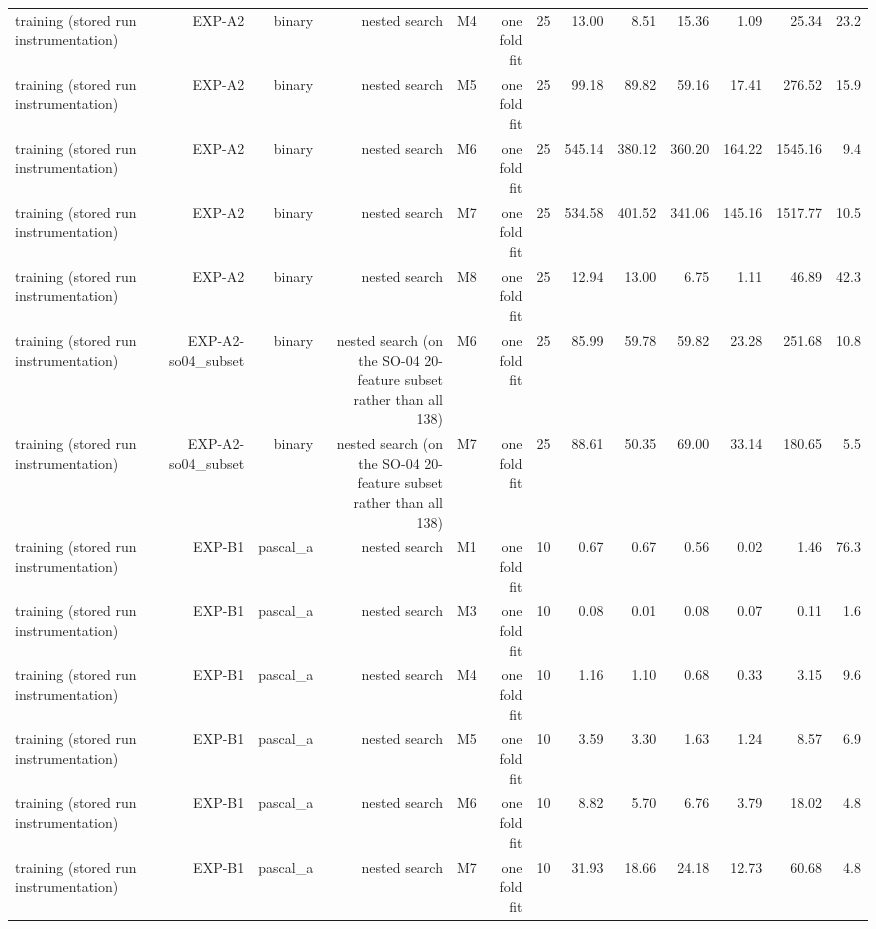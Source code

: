 \begin{table}[htbp]
\begin{tabular}{lrrrrrrrrrrrr}
    training (stored run instrumentation) & EXP-A2 & binary & nested search & M4 & one fold fit & 25 & 13.00 & 8.51 & 15.36 & 1.09 & 25.34 & 23.2 \\
    training (stored run instrumentation) & EXP-A2 & binary & nested search & M5 & one fold fit & 25 & 99.18 & 89.82 & 59.16 & 17.41 & 276.52 & 15.9 \\
    training (stored run instrumentation) & EXP-A2 & binary & nested search & M6 & one fold fit & 25 & 545.14 & 380.12 & 360.20 & 164.22 & 1545.16 & 9.4 \\
    training (stored run instrumentation) & EXP-A2 & binary & nested search & M7 & one fold fit & 25 & 534.58 & 401.52 & 341.06 & 145.16 & 1517.77 & 10.5 \\
    training (stored run instrumentation) & EXP-A2 & binary & nested search & M8 & one fold fit & 25 & 12.94 & 13.00 & 6.75 & 1.11 & 46.89 & 42.3 \\
    training (stored run instrumentation) & EXP-A2-so04\_subset & binary & nested search (on the SO-04 20-feature subset rather than all 138) & M6 & one fold fit & 25 & 85.99 & 59.78 & 59.82 & 23.28 & 251.68 & 10.8 \\
    training (stored run instrumentation) & EXP-A2-so04\_subset & binary & nested search (on the SO-04 20-feature subset rather than all 138) & M7 & one fold fit & 25 & 88.61 & 50.35 & 69.00 & 33.14 & 180.65 & 5.5 \\
    training (stored run instrumentation) & EXP-B1 & pascal\_a & nested search & M1 & one fold fit & 10 & 0.67 & 0.67 & 0.56 & 0.02 & 1.46 & 76.3 \\
    training (stored run instrumentation) & EXP-B1 & pascal\_a & nested search & M3 & one fold fit & 10 & 0.08 & 0.01 & 0.08 & 0.07 & 0.11 & 1.6 \\
    training (stored run instrumentation) & EXP-B1 & pascal\_a & nested search & M4 & one fold fit & 10 & 1.16 & 1.10 & 0.68 & 0.33 & 3.15 & 9.6 \\
    training (stored run instrumentation) & EXP-B1 & pascal\_a & nested search & M5 & one fold fit & 10 & 3.59 & 3.30 & 1.63 & 1.24 & 8.57 & 6.9 \\
    training (stored run instrumentation) & EXP-B1 & pascal\_a & nested search & M6 & one fold fit & 10 & 8.82 & 5.70 & 6.76 & 3.79 & 18.02 & 4.8 \\
    training (stored run instrumentation) & EXP-B1 & pascal\_a & nested search & M7 & one fold fit & 10 & 31.93 & 18.66 & 24.18 & 12.73 & 60.68 & 4.8 \\

\end{tabular}
\end{table}
